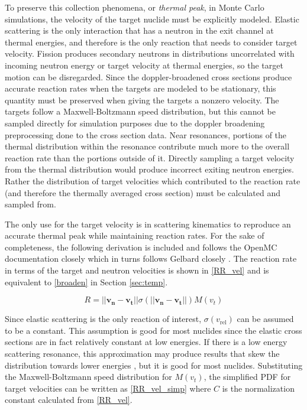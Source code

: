 To preserve this collection phenomena, or \emph{thermal peak}, in Monte Carlo simulations, the velocity of the target nuclide must be explicitly modeled.  Elastic scattering is the only interaction that has a neutron in the exit channel at thermal energies, and therefore is the only reaction that needs to consider target velocity.  Fission produces secondary neutrons in distributions uncorrelated with incoming neutron energy or target velocity at thermal energies, so the target motion can be disregarded.  Since the doppler-broadened cross sections produce accurate reaction rates when the targets are modeled to be stationary, this quantity must be preserved when giving the targets a nonzero velocity.  The targets follow a Maxwell-Boltzmann speed distribution, but this cannot be sampled directly for simulation purposes due to the doppler broadening preprocessing done to the cross section data.  Near resonances, portions of the thermal distribution within the resonance contribute much more to the overall reaction rate than the portions outside of it.  Directly sampling a target velocity from the thermal distribution would produce incorrect exiting neutron energies.  Rather the distribution of target velocities which contributed to the reaction rate (and therefore the thermally averaged cross section) must be calculated and sampled from.

The only use for the target velocity is in scattering kinematics to reproduce an accurate thermal peak while maintaining reaction rates.  For the sake of completeness, the following derivation is included and follows the OpenMC documentation closely which in turns follows Gelbard closely \cite{openmc}\cite{gelbard}.  The reaction rate in terms of the target and neutron velocities is shown in \eqref{RR_vel} and is equivalent to \eqref{broaden} in Section \ref{sec:temp}.

\begin{equation}
\label{RR_vel}
R = ||\boldsymbol{v_n}-\boldsymbol{v_t}|| \sigma(||\boldsymbol{v_n}-\boldsymbol{v_t}||) M(v_t)
\end{equation}

Since elastic scattering is the only reaction of interest, $\sigma(v_\mathrm{rel})$ can be assumed to be a constant.  This assumption is good for most nuclides since the elastic cross sections are in fact relatively constant at low energies.  If there is a low energy scattering resonance, this approximation may produce results that skew the distribution towards lower energies \cite{openmc}, but it is good for most nuclides.  Substituting the Maxwell-Boltzmann speed distribution for $M(v_t)$, the simplified PDF for target velocities can be written as \eqref{RR_vel_simp} where $C$ is the normalization constant calculated from \eqref{RR_vel}.

